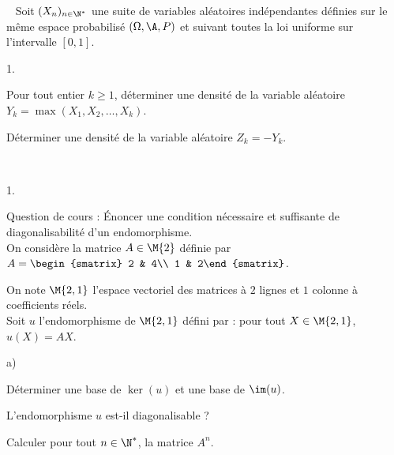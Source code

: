 \documentclass[11pt]{article}%
\begin{document}
\begin{exerciceSP}~
  Soit $(X_n)_{n\in\N^*}$ une suite de variables aléatoires
  indépendantes définies sur le même espace probabilisé
  $(\Omega,\A,P)$ et suivant toutes la loi uniforme sur l'intervalle
  $[0,1]$.
  \begin{noliste}{1.}
    \setlength{\itemsep}{2mm}
  \item Pour tout entier $k\geq 1$, déterminer une densité de la
    variable aléatoire $Y_k=\max(X_1,X_2,\hdots,X_k)$.
  \item Déterminer une densité de la variable aléatoire $Z_k=-Y_k$.
  \end{noliste}
\end{exerciceSP}


\newpage


\begin{exerciceAP}~\\
  \begin{noliste}{1.}
    \setlength{\itemsep}{2mm}
  \item Question de cours : Énoncer une condition nécessaire et
    suffisante de diagonalisabilité d'un endomorphisme.\\
    On considère la matrice $A\in\M{2}$ définie par $A=\begin{smatrix} 2 & 4\\
    1 & 2\end{smatrix}$.
  \item On note $\M{2,1}$ l'espace vectoriel des matrices à $2$ lignes
    et $1$ colonne à coefficients réels.\\
    Soit $u$ l'endomorphisme de $\M{2,1}$ défini par : pour tout
    $X\in\M{2,1}$, $u(X)=AX$.
    \begin{noliste}{a)}
    \setlength{\itemsep}{2mm}
    \item Déterminer une base de $\ker(u)$ et une base de $\im(u)$.
    \item L'endomorphisme $u$ est-il diagonalisable ?
    \item Calculer pour tout $n\in\N^*$, la matrice $A^n$.
    \end{noliste}


\end{noliste}
\end{exerciceAP}
\end{document}
